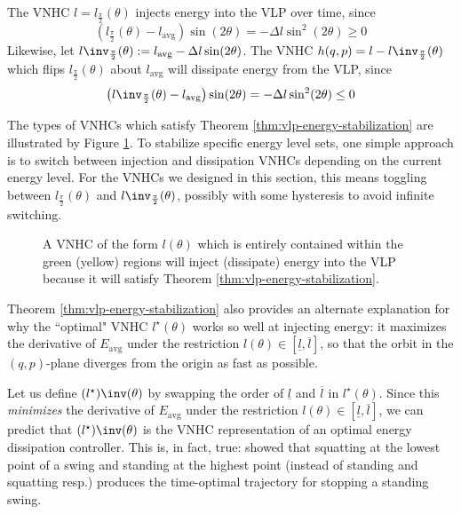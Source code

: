 \begin{cor}
   The VNHC \(l = l_\frac{\pi}{2}(\theta)\) injects energy into the VLP
   over time, since 
   \[
      \left(l_\frac{\pi}{2}(\theta) - l_\text{avg}\right)\sin(2\theta) = 
   -\Delta l \sin^2(2\theta) \geq 0
   \] 
   Likewise, let 
   \(l\inv_\frac{\pi}{2}(\theta) := l_\text{avg} - \Delta l \sin(2\theta)\).
    The VNHC \(h(q,p) = l - l\inv_\frac{\pi}{2}(\theta)\) which flips 
    \(l_\frac{\pi}{2}(\theta)\) about \(l_\text{avg}\) will dissipate energy from
   the VLP, since 
   \[
      \left(l\inv_\frac{\pi}{2}(\theta) - l_\text{avg}\right)\sin(2\theta) = 
      -\Delta l \sin^2(2\theta) \leq 0
   \] 
\end{cor}

The types of VNHCs which satisfy Theorem \ref{thm:vlp-energy-stabilization} are illustrated by Figure
\ref{fig:vlp-energy-in-out}. To stabilize specific energy level sets, one simple
approach is to switch between injection and dissipation VNHCs depending on the
current energy level.
For the VNHCs we designed in this section, this means toggling
between \(l_\frac{\pi}{2}(\theta)\) and \(l\inv_\frac{\pi}{2}(\theta)\),
possibly with some hysteresis to avoid infinite switching.  

\begin{figure}
   \centering
   
   \caption{A VNHC of the form \(l(\theta)\) which is entirely contained within
      the green (yellow) regions will inject (dissipate) energy into the VLP
      because it will satisfy Theorem \ref{thm:vlp-energy-stabilization}.}
      \label{fig:vlp-energy-in-out}
\end{figure}

Theorem \ref{thm:vlp-energy-stabilization} also provides an alternate
explanation for why the ``optimal" VNHC \(l^\star(\theta)\) works so well at
injecting energy: it maximizes the derivative of \(E_\text{avg}\) under the
restriction \(l(\theta) \in [\underline{l},\overline{l}]\), so that the orbit in the
\((q,p)\)-plane diverges from the origin as fast as possible. 

Let us define \((l^\star)\inv(\theta)\) by swapping the order of 
\(\underline{l}\) and \(\overline{l}\) in \(l^\star(\theta)\). Since this 
\textit{minimizes} the derivative of \(E_\text{avg}\) under the restriction
\(l(\theta) \in [\underline{l},\overline{l}]\), we can predict that 
\((l^\star)\inv(\theta)\) is the VNHC representation of an optimal 
energy dissipation controller.
This is, in fact, true: \cite{pumping_swing_standing_squatting} showed 
that squatting at the lowest point of a swing and standing at the highest
point (instead of standing and squatting resp.) produces the
time-optimal trajectory for stopping a standing swing. 

